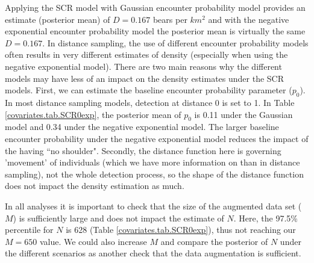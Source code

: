 Applying the SCR model with Gaussian encounter probability model
 provides an
estimate (posterior mean) of $D = 0.167$ bears per $km^2$ and with the
negative exponential encounter probability model
the posterior mean  is virtually the
same $D = 0.167$.  In distance sampling, the use of different
encounter probability models
 often results in very different estimates of density
(especially when using the negative exponential model).  There are
two main reasons why the different models  may have less of
an impact on the density estimates under the SCR models.  First, we
can estimate the baseline encounter probability
 parameter ($p_0$).  
In most
distance sampling models, detection at distance 0 is set to 1.  In
Table \ref{covariates.tab.SCR0exp}, the posterior mean of $p_0$ is
0.11 under the Gaussian  model and 0.34 under the negative
exponential model.  The larger baseline encounter probability
 under the negative
exponential model reduces the impact of the having ``no shoulder".
Secondly, the distance function here is governing 'movement' of
individuals (which we have more information on than in distance
sampling), not the whole detection process, so the shape of the
distance function does not impact the density estimation as much.

In all analyses it is important to check that the size of the
augmented data set ($M$) is sufficiently large and does not impact 
the estimate of $N$.  Here, the 97.5\%
percentile for $N$ is 628 (Table \ref{covariates.tab.SCR0exp}), thus not reaching our $M=650$ value.
We could also increase
$M$ and compare the posterior of $N$ under the different scenarios as another check 
that the data augmentation is sufficient.  

